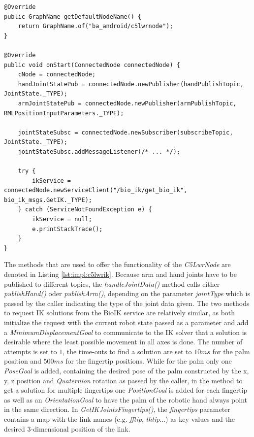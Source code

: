 \begin{lstlisting}[caption={Startup of the C5LwrNode}, label=lst:impl:c5lwrnode]
@Override
public GraphName getDefaultNodeName() {
	return GraphName.of("ba_android/c5lwrnode");
}

@Override
public void onStart(ConnectedNode connectedNode) {
	cNode = connectedNode;
	handJointStatePub = connectedNode.newPublisher(handPublishTopic, JointState._TYPE);
	armJointStatePub = connectedNode.newPublisher(armPublishTopic, RMLPositionInputParameters._TYPE);

	jointStateSubsc = connectedNode.newSubscriber(subscribeTopic, JointState._TYPE);
	jointStateSubsc.addMessageListener(/* ... */);

	try {
		ikService = connectedNode.newServiceClient("/bio_ik/get_bio_ik", bio_ik_msgs.GetIK._TYPE);
	} catch (ServiceNotFoundException e) {
		ikService = null;
		e.printStackTrace();
	}
}
\end{lstlisting}

The methods that are used to offer the functionality of the \textit{C5LwrNode} are denoted in Listing \ref{lst:impl:c5lwrik}. Because arm and hand joints have to be published to different topics, the \textit{handleJointData()} method calls either \textit{publishHand()} oder \textit{publishArm()}, depending on the parameter \textit{jointType} which is passed by the caller indicating the type of the joint data given. The two methods to request IK solutions from the BioIK service are relatively similar, as both initialize the request with the current robot state passed as a parameter and add a \textit{MinimumDisplacementGoal} to communicate to the IK solver that a solution is desirable where the least possible movement in all axes is done. The number of attempts is set to $1$, the time-outs to find a solution are set to $10ms$ for the palm position and $500ms$ for the fingertip positions. While for the palm only one \textit{PoseGoal} is added, containing the desired pose of the palm constructed by the x, y, z position and \textit{Quaternion} rotation as passed by the caller, in the method to get a solution for multiple fingertips one \textit{PositionGoal} is added for each fingertip as well as an \textit{OrientationGoal} to have the palm of the robotic hand always point in the same direction. In \textit{GetIKJointsFingertips()}, the \textit{fingertips} parameter contains a map with the link names (e.g. \textit{fftip}, \textit{thtip}...) as key values and the desired 3-dimensional position of the link.


